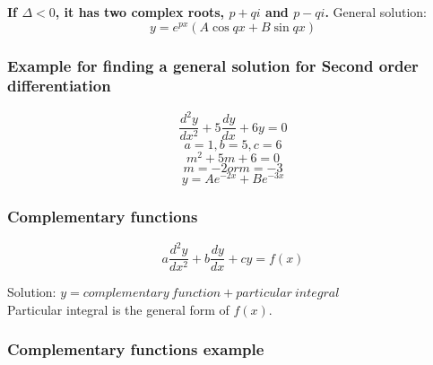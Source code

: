 \documentclass[a4paper,9pt]{scrartcl}
\begin{document}
    \textbf{If $\Delta < 0$, it has two complex roots, $p + qi$ and $p - qi$. }
    General solution:
    \begin{displaymath}
        y = e^{px}(A\cos{qx}+B\sin{qx})
    \end{displaymath}

    \subsubsection{Example for finding a general solution for Second order differentiation}

    \begin{displaymath}
        \frac{d^{2}y}{dx^2} + 5\frac{dy}{dx} + 6y = 0
    \end{displaymath}
    \begin{displaymath}
        a = 1, b = 5, c = 6
    \end{displaymath}
    \begin{displaymath}
        m^2 + 5m + 6 = 0
    \end{displaymath}
    \begin{displaymath}
        m = -2 or m = -3
    \end{displaymath}
    \begin{displaymath}
        y = Ae^{-2x}+Be^{-3x}
    \end{displaymath}

    \subsubsection{Complementary functions}

    \begin{displaymath}
        a\frac{d^{2}y}{dx^2} + b\frac{dy}{dx} + cy = f(x)
    \end{displaymath}

    Solution: $y = complementary\ function + particular\ integral$ \\

    Particular integral is the general form of $f(x)$. \\

    \subsubsection{Complementary functions example}
\end{document}
